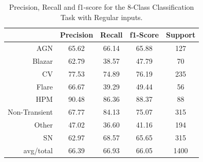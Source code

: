 \documentclass[a4paper,fleqn,usenatbib]{mnras}
\begin{document}
\begin{table}
\centering
\begin{tabular}{|r|c|c|c|c|}
\hline
\multicolumn{1}{|l|}{} & Precision & Recall & f1-Score & Support \\ \hline \hline
AGN                    & 65.62              & 66.14             & 65.88             & 127             \\ \hline
Blazar                 & 62.79           & 38.57          & 47.79          & 70          \\ \hline
CV                     & 77.53               & 74.89              & 76.19              & 235              \\ \hline
Flare                  & 66.67            & 39.29           & 49.44           & 56           \\ \hline
HPM                    & 90.48              & 86.36             & 88.37             & 88             \\ \hline
Non-Transient          & 67.77    & 84.13   & 75.07   & 315   \\ \hline
Other                  & 47.02            & 36.60           & 41.16           & 194           \\ \hline
SN                     & 62.97               & 68.57              & 65.65              & 315              \\ \hline
avg/total              & 66.39            & 66.93           & 66.05           & 1400           \\ \hline
\end{tabular}
\caption{Precision, Recall and f1-score for the 8-Class Classification Task with Regular inputs.}
\label{Overall-Scores-8-Class-Regular}
\end{table}
\end{document}
